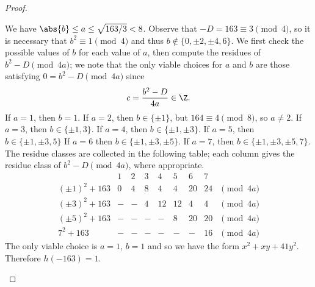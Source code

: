 \documentclass[10pt]{amsart}
\begin{document}
\begin{thm}
\begin{proof}
\begin{enumerate}[(a)]
      We have $\abs{b} \leq a \leq \sqrt{163/3} < 8$.
      Observe that $-D = 163 \equiv 3 \pmod{4}$, so it is necessary that $b^2 \equiv 1 \pmod{4}$ and thus $b \not \in \{0, \pm 2, \pm 4, 6\}$.
      We first check the possible values of $b$ for each value of $a$, then compute the residues of $b^2 - D \pmod {4a}$; we note that the only viable choices for $a$ and $b$ are those satisfying $0 = b^2 - D \pmod{4a}$ since
      $$c = \frac{b^2 - D}{4a} \in \Z.$$
      If $a = 1$, then $b = 1$.
      If $a = 2$, then $b \in \{\pm 1\}$, but $164 \equiv 4 \pmod{8}$, so $a \neq 2$. 
      If $a = 3$, then $b \in \{\pm 1, 3\}$.
      If $a = 4$, then $b \in \{\pm 1, \pm 3\}$.
      If $a = 5$, then $b \in \{\pm 1, \pm 3, 5\}$
      If $a = 6$ then $b \in \{\pm 1, \pm 3, \pm 5\}$.
      If $a = 7$, then $b \in \{\pm 1, \pm 3, \pm 5, 7\}$.
      The residue classes are collected in the following table; each column gives the residue class of $b^2 - D \pmod{4a}$, where appropriate.
      $$\begin{array}{c||cccccccc}
                        & 1 & 2 & 3 & 4 & 5 & 6 & 7\\
        \hline        
        (\pm 1)^2 + 163 & 0 & 4 & 8 & 4  & 4  & 20 & 24 & \pmod{4a}\\
        (\pm 3)^2 + 163 & - & - & 4 & 12 & 12 & 4  & 4  & \pmod{4a}\\
        (\pm 5)^2 + 163 & - & - & - & -  & 8  & 20 & 20 & \pmod{4a}\\
        7^2 + 163       & - & - & - & -  & -  & -  & 16 & \pmod{4a}
      \end{array}$$
      The only viable choice is $a = 1$, $b = 1$ and so we have the form $x^2 + xy + 41y^2$.
      Therefore $h(-163) = 1$.
    \end{enumerate}
  \end{proof}
\end{thm}
\end{document}
